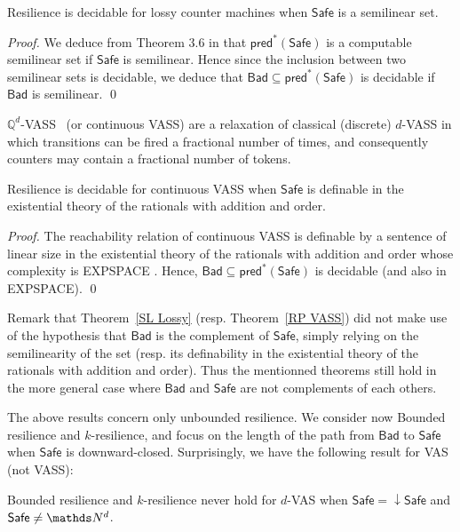 \documentclass[runningheads]{llncs}
\newcommand{\pred}{\textsf{pred}}
\newcommand{\Bad}{\textsf{Bad}}
\newcommand{\Safe}{\textsf{Safe}}
\begin{document}
\begin{theorem}\label{SL Lossy}
{\sc Resilience} is decidable for lossy counter machines when $\Safe$  is a semilinear set.
\end{theorem}

\begin{proof}
We deduce from Theorem 3.6 in \cite{DBLP:conf/rp/Schnoebelen10} that $\pred^*(\Safe)$ is a computable semilinear set if $\Safe$ is semilinear. Hence since the inclusion between two semilinear sets is decidable, we deduce that $\Bad \subseteq \pred^*(\Safe)$ is decidable if $\Bad$ is semilinear. \qed
\end{proof}






$\mathds{Q}^d$-VASS~\cite{DBLP:journals/tocl/BlondinFHH17} (or continuous VASS) are a relaxation of classical (discrete) $d$-VASS in which transitions can be fired a fractional number of times, and consequently counters may contain a fractional number of tokens.

\begin{theorem}\label{RP VASS}
{\sc Resilience} is decidable for continuous VASS when $\Safe$  is
definable in the existential theory of the rationals with addition and order.
\end{theorem}

\begin{proof}
The reachability relation of continuous VASS is definable by a sentence of linear size in the existential theory of
the rationals with addition and order whose complexity is EXPSPACE \cite{DBLP:journals/tocl/BlondinFHH17}. Hence, $\Bad \subseteq \pred^*(\Safe)$ is decidable (and also in EXPSPACE). \qed
\end{proof}


Remark that
Theorem~\ref{SL Lossy} 
(resp. Theorem~\ref{RP VASS})
did not make use of the hypothesis that $\Bad$ is the complement of $\Safe$, simply relying on the
semilinearity of the set (resp. its definability in the existential theory of the rationals with addition and order). Thus 
the mentionned theorems still hold in the more general case where $\Bad$ and $\Safe$ are not complements of each others.

The above results concern only unbounded resilience. We consider now 
{\sc Bounded resilience} and {\sc $k$-resilience}, and focus on the length of
the path from $\Bad$ to $\Safe$
when $\Safe$ is downward-closed. Surprisingly, we have the following result for VAS (not VASS):
\begin{proposition}
{\sc Bounded resilience} and {\sc $k$-resilience} never hold for $d$-VAS when $\Safe = \mathop{\downarrow} \Safe$ and $\Safe \neq \N^d$.
\end{proposition}
\end{document}
